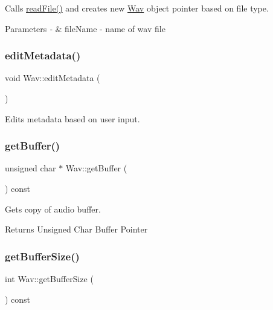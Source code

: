 Calls \hyperlink{classWav_a1c4230cec49d30147a5b8a1950083f7c}{read\+File()} and creates new \hyperlink{classWav}{Wav} object pointer based on file type.


\begin{DoxyParams}{Parameters}
{\em -\/} & file\+Name -\/ name of wav file \\
\hline
\end{DoxyParams}
\mbox{\label{classWav_af5b4f1d400f83bf349464e3403b765b2}} 
\subsubsection{\texorpdfstring{edit\+Metadata()}{editMetadata()}}
{\footnotesize\ttfamily void Wav\+::edit\+Metadata (\begin{DoxyParamCaption}{ }\end{DoxyParamCaption})}

Edits metadata based on user input. \mbox{\label{classWav_aa713fc552ec8d011df0acede14d23295}} 
\subsubsection{\texorpdfstring{get\+Buffer()}{getBuffer()}}
{\footnotesize\ttfamily unsigned char $\ast$ Wav\+::get\+Buffer (\begin{DoxyParamCaption}{ }\end{DoxyParamCaption}) const}

Gets copy of audio buffer. \begin{DoxyReturn}{Returns}
Unsigned Char Buffer Pointer 
\end{DoxyReturn}
\mbox{\label{classWav_a71fdfa1d9f5e7c1b86f07bbff4249dca}} 
\subsubsection{\texorpdfstring{get\+Buffer\+Size()}{getBufferSize()}}
{\footnotesize\ttfamily int Wav\+::get\+Buffer\+Size (\begin{DoxyParamCaption}{ }\end{DoxyParamCaption}) const}

